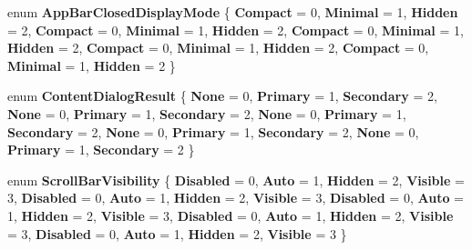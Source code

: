 \begin{DoxyCompactItemize}
enum {\bfseries App\+Bar\+Closed\+Display\+Mode} \{ \newline
{\bfseries Compact} = 0, 
{\bfseries Minimal} = 1, 
{\bfseries Hidden} = 2, 
{\bfseries Compact} = 0, 
\newline
{\bfseries Minimal} = 1, 
{\bfseries Hidden} = 2, 
{\bfseries Compact} = 0, 
{\bfseries Minimal} = 1, 
\newline
{\bfseries Hidden} = 2, 
{\bfseries Compact} = 0, 
{\bfseries Minimal} = 1, 
{\bfseries Hidden} = 2, 
\newline
{\bfseries Compact} = 0, 
{\bfseries Minimal} = 1, 
{\bfseries Hidden} = 2
 \}
\item 
\mbox{\label{namespace_windows_1_1_u_i_1_1_xaml_1_1_controls_aeb84959a5f71279742b9e779903775a6}} 
enum {\bfseries Content\+Dialog\+Result} \{ \newline
{\bfseries None} = 0, 
{\bfseries Primary} = 1, 
{\bfseries Secondary} = 2, 
{\bfseries None} = 0, 
\newline
{\bfseries Primary} = 1, 
{\bfseries Secondary} = 2, 
{\bfseries None} = 0, 
{\bfseries Primary} = 1, 
\newline
{\bfseries Secondary} = 2, 
{\bfseries None} = 0, 
{\bfseries Primary} = 1, 
{\bfseries Secondary} = 2, 
\newline
{\bfseries None} = 0, 
{\bfseries Primary} = 1, 
{\bfseries Secondary} = 2
 \}
\item 
\mbox{\label{namespace_windows_1_1_u_i_1_1_xaml_1_1_controls_a001a76f53e0cb6e7acfde3aeca1adf39}} 
enum {\bfseries Scroll\+Bar\+Visibility} \{ \newline
{\bfseries Disabled} = 0, 
{\bfseries Auto} = 1, 
{\bfseries Hidden} = 2, 
{\bfseries Visible} = 3, 
\newline
{\bfseries Disabled} = 0, 
{\bfseries Auto} = 1, 
{\bfseries Hidden} = 2, 
{\bfseries Visible} = 3, 
\newline
{\bfseries Disabled} = 0, 
{\bfseries Auto} = 1, 
{\bfseries Hidden} = 2, 
{\bfseries Visible} = 3, 
\newline
{\bfseries Disabled} = 0, 
{\bfseries Auto} = 1, 
{\bfseries Hidden} = 2, 
{\bfseries Visible} = 3, 
\newline
{\bfseries Disabled} = 0, 
{\bfseries Auto} = 1, 
{\bfseries Hidden} = 2, 
{\bfseries Visible} = 3
 \}
\item 
\mbox{\label{namespace_windows_1_1_u_i_1_1_xaml_1_1_controls_a9bf3cca91778a25f599f39263931d8f8}} 

\end{DoxyCompactItemize}
